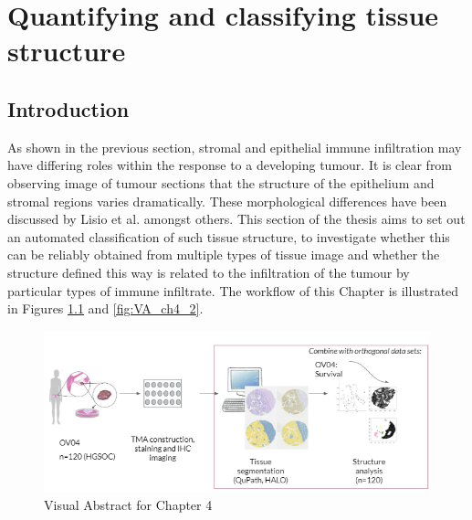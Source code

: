 \chapter{Quantifying and classifying tissue structure}

\ifpdf
    \graphicspath{{Chapter3/Figs/Raster/}{Chapter3/Figs/PDF/}{Chapter3/Figs/}}
\else
    \graphicspath{{Chapter3/Figs/Vector/}{Chapter3/Figs/}}
\fi
\section{Introduction}
As shown in the previous section, stromal and epithelial immune infiltration may have differing roles within the response to a developing tumour. It is clear from observing image of tumour sections that the structure of the epithelium and stromal regions varies dramatically. These morphological differences have been discussed by Lisio et al. \cite{Lisio2019Feb} amongst others. This section of the thesis aims to set out an automated classification of such tissue structure, to investigate whether this can be reliably obtained from multiple types of tissue image and whether the structure defined this way is related to the infiltration of the tumour by particular types of immune infiltrate.  The workflow of this Chapter is illustrated in Figures \ref{fig:VA_ch4} and \ref{fig:VA_ch4_2}.

\begin{figure}
    \centering
    \includegraphics{Chapter3/Figs/Chapter3_VA.PNG}
    \caption{Visual Abstract for Chapter 4}
    \label{fig:VA_ch4}
\end{figure}

